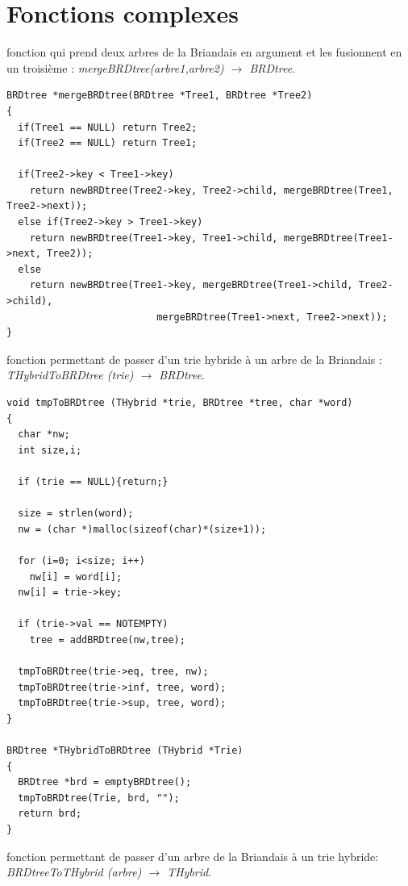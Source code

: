 \documentclass[a4paper,8pt]{report}
\begin{document}
\chapter{Fonctions complexes}

fonction qui prend deux arbres de la Briandais en argument et les fusionnent en un troisi\`eme : \textit{mergeBRDtree(arbre1,arbre2) $\rightarrow$ BRDtree}.
\begin{verbatim}
BRDtree *mergeBRDtree(BRDtree *Tree1, BRDtree *Tree2)
{
  if(Tree1 == NULL) return Tree2;
  if(Tree2 == NULL) return Tree1;
  
  if(Tree2->key < Tree1->key)
    return newBRDtree(Tree2->key, Tree2->child, mergeBRDtree(Tree1, Tree2->next));
  else if(Tree2->key > Tree1->key)
    return newBRDtree(Tree1->key, Tree1->child, mergeBRDtree(Tree1->next, Tree2));
  else
    return newBRDtree(Tree1->key, mergeBRDtree(Tree1->child, Tree2->child),
		                  mergeBRDtree(Tree1->next, Tree2->next));
}
\end{verbatim}

fonction permettant de passer d'un trie hybride \`a un arbre de la Briandais : \textit{THybridToBRDtree (trie) $\rightarrow$ BRDtree}.
\begin{verbatim}
void tmpToBRDtree (THybrid *trie, BRDtree *tree, char *word)
{
  char *nw;
  int size,i;
  
  if (trie == NULL){return;}
 
  size = strlen(word);
  nw = (char *)malloc(sizeof(char)*(size+1));
  
  for (i=0; i<size; i++)
    nw[i] = word[i];
  nw[i] = trie->key;
  
  if (trie->val == NOTEMPTY)
    tree = addBRDtree(nw,tree);
  
  tmpToBRDtree(trie->eq, tree, nw);
  tmpToBRDtree(trie->inf, tree, word);
  tmpToBRDtree(trie->sup, tree, word);
}

BRDtree *THybridToBRDtree (THybrid *Trie)
{
  BRDtree *brd = emptyBRDtree();
  tmpToBRDtree(Trie, brd, "");
  return brd;
}
\end{verbatim}

fonction permettant de passer d'un arbre de la Briandais \`a un trie hybride: \textit{BRDtreeToTHybrid (arbre) $\rightarrow$ THybrid}.
\begin{verbatim}
\end{verbatim}
\end{document}
